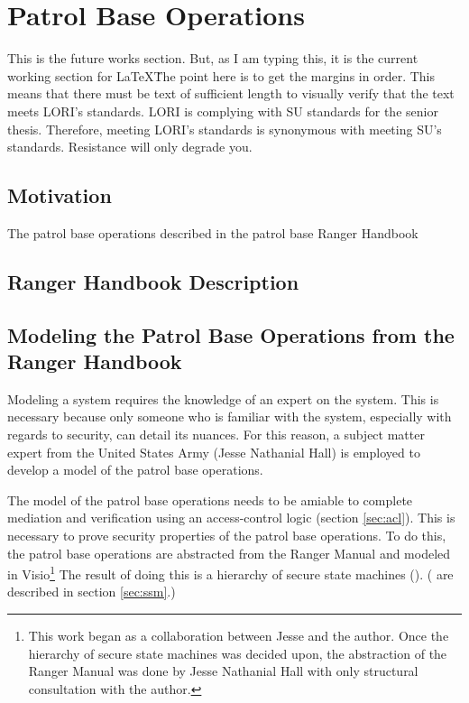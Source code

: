 \documentclass[../../main/main.tex]{subfiles}
\begin{document}
\chapter{Patrol Base Operations}
This is the future works section. But, as I am typing this, it is the current working section for \LaTeX\.  The point here is to get the margins in order.   This means that there must be text of sufficient length to visually verify that the text meets LORI's standards.  LORI is complying with SU standards for the senior thesis.  Therefore, meeting LORI's standards is synonymous with meeting SU's standards.  Resistance will only degrade you.
\section{Motivation}
The patrol base operations described in the patrol base Ranger Handbook

\section{Ranger Handbook Description}

\section{Modeling the Patrol Base Operations from the Ranger Handbook}\label{sec:modelingpb}
\glsresetall[\acronymtype]
Modeling a system requires the knowledge of an expert on the system.  This is necessary because only someone who is familiar with the system, especially with regards to security, can detail its nuances.  For this reason, a subject matter expert from the United States Army (Jesse Nathanial Hall) is employed to develop a model of the patrol base operations. 

The model of the patrol base operations needs to be amiable to complete mediation and verification using an access-control logic (section \ref{sec:acl}).  This is necessary to prove security properties of the patrol base operations.  To do this, the patrol base operations are abstracted from the Ranger Manual and modeled in Visio\footnote{This work began as a collaboration between Jesse and the author.  Once the hierarchy of secure state machines was decided upon, the abstraction of the Ranger Manual was done by Jesse Nathanial Hall with only structural consultation with the author.}  The result of doing this is a hierarchy of secure state machines (). ( are described in section \ref{sec:ssm}.)  
\end{document}
